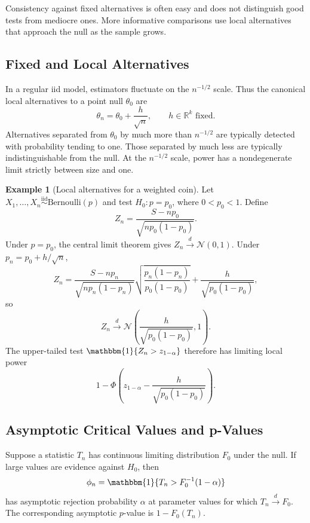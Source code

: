 \documentclass[12pt,oneside]{book}
\numberwithin{equation}{section}
\theoremstyle{definition}
\newtheorem{example}{Example}[section]
\theoremstyle{plain}
\theoremstyle{remark}
\newcommand{\R}{\mathbb{R}}
\newcommand{\ind}{\mathbbm{1}}
\newcommand{\iid}{\overset{\text{iid}}{\sim}}
\newcommand{\convd}{\overset{d}{\to}}
\newcommand{\Normal}{\mathcal{N}}
\newcommand{\Bern}{\mathrm{Bernoulli}}
\begin{document}
Consistency against fixed alternatives is often easy and does not distinguish
good tests from mediocre ones.  More informative comparisons use local
alternatives that approach the null as the sample grows.

\subsection{Fixed and Local Alternatives}

In a regular iid model, estimators fluctuate on the $n^{-1/2}$ scale.  Thus
the canonical local alternatives to a point null $\theta_0$ are
\begin{equation}
    \theta_n=\theta_0+\frac{h}{\sqrt n},
    \qquad h\in\R^k\text{ fixed}.
    \label{eq:local-alternatives}
\end{equation}
Alternatives separated from $\theta_0$ by much more than $n^{-1/2}$ are
typically detected with probability tending to one.  Those separated by much
less are typically indistinguishable from the null.  At the $n^{-1/2}$ scale,
power has a nondegenerate limit strictly between size and one.

\begin{example}[Local alternatives for a weighted coin]
Let $X_1,\ldots,X_n\iid\Bern(p)$ and test $H_0:p=p_0$, where
$0<p_0<1$.  Define
\[
    Z_n=\frac{S-np_0}{\sqrt{np_0(1-p_0)}}.
\]
Under $p=p_0$, the central limit theorem gives $Z_n\convd\Normal(0,1)$.
Under $p_n=p_0+h/\sqrt n$,
\[
 Z_n
 =\frac{S-np_n}{\sqrt{np_n(1-p_n)}}
   \sqrt{\frac{p_n(1-p_n)}{p_0(1-p_0)}}
   +\frac{h}{\sqrt{p_0(1-p_0)}},
\]
so
\begin{equation}
    Z_n\convd
    \Normal\left(\frac{h}{\sqrt{p_0(1-p_0)}},1\right).
    \label{eq:coin-local-normal}
\end{equation}
The upper-tailed test $\ind\{Z_n>z_{1-\alpha}\}$ therefore has limiting
local power
\[
    1-\Phi\left(z_{1-\alpha}
       -\frac{h}{\sqrt{p_0(1-p_0)}}\right).
\]
\end{example}

\subsection{Asymptotic Critical Values and p-Values}

Suppose a statistic $T_n$ has continuous limiting distribution $F_0$ under
the null.  If large values are evidence against $H_0$, then
\[
    \phi_n=\ind\{T_n>F_0^{-1}(1-\alpha)\}
\]
has asymptotic rejection probability $\alpha$ at parameter values for which
$T_n\convd F_0$.  The corresponding asymptotic $p$-value is
$1-F_0(T_n)$.
\end{document}
